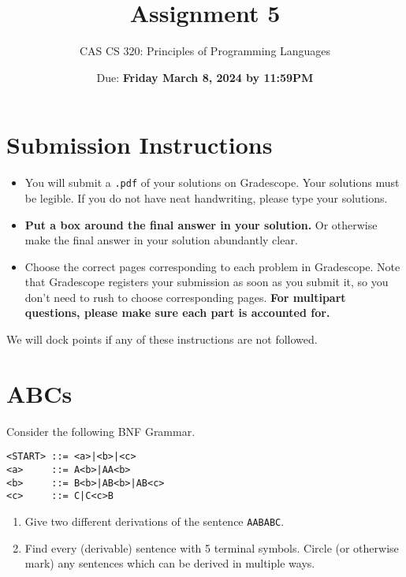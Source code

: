 \documentclass{article}
\title{
Assignment 5
}
\author{CAS CS 320: Principles of Programming Languages}
\date{Due: \textbf{Friday March 8, 2024 by 11:59PM}}
\theoremstyle{remark} \newtheorem*{solution}{Solution}
\begin{document}
\maketitle
\section*{Submission Instructions}
\begin{itemize}
\item
You will submit a \texttt{.pdf} of your solutions on Gradescope.  Your
solutions must be legible. If you do not have neat handwriting, please
type your solutions.
\item
\textbf{Put a box around the final answer in your solution.}  Or
otherwise make the final answer in your solution abundantly clear.
\item
Choose the correct pages corresponding to each problem in Gradescope.
Note that Gradescope registers your submission as soon as you submit
it, so you don’t need to rush to choose corresponding pages.
\textbf{For multipart questions, please make sure each part is
  accounted for.}
\end{itemize}
We will dock points if any of these instructions are not followed.

\pagebreak
\section{ABCs}
Consider the following BNF Grammar.
\begin{lstlisting}
<START> ::= <a>|<b>|<c>
<a>     ::= A<b>|AA<b>
<b>     ::= B<b>|AB<b>|AB<c>
<c>     ::= C|C<c>B
\end{lstlisting}

\begin{enumerate}
\item
Give two different derivations of the sentence \texttt{AABABC}.
\item
Find every (derivable) sentence with 5 terminal symbols.  Circle (or
otherwise mark) any sentences which can be derived in multiple ways.
\end{enumerate}
\end{document}
